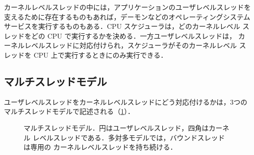 \documentclass[../main.tex]{subfiles}
\begin{document}
カーネルレベルスレッドの中には，アプリケーションのユーザレベルスレッドを
支えるために存在するものもあれば，デーモンなどのオペレーティングシステム
サービスを実行するものもある．CPU スケジューラは，どのカーネルレベル
スレッドをどの CPU で実行するかを決める．一方ユーザレベルスレッドは，
カーネルレベルスレッドに対応付けられ，スケジューラがそのカーネルレベル
スレッドを CPU 上で実行するときにのみ実行できる．

\subsection{マルチスレッドモデル}

ユーザレベルスレッドをカーネルレベルスレッドにどう対応付けるかは，3つの
マルチスレッドモデルで記述される（\cref{fig:l03-mt-models}）．%

\begin{figure}[htbp]
  \centering
  
  \caption{マルチスレッドモデル．円はユーザレベルスレッド，四角はカーネル
    レベルスレッドである．多対多モデルでは，バウンドスレッドは専用の
    カーネルレベルスレッドを持ち続ける．}
  \label{fig:l03-mt-models}
\end{figure}
\end{document}
